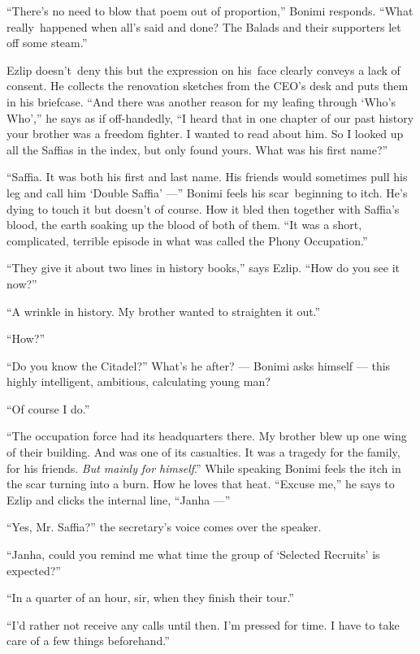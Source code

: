 \documentclass[twoside,11pt]{book}
\begin{document}
``There's no need to blow that poem out of proportion,'' Bonimi responds. ``What
really~happened when all's said and done? The Balads and their supporters let off some steam.''

Ezlip doesn't~deny this but the expression on his~face clearly conveys a lack of consent. He collects the renovation
sketches from the CEO's desk and puts them in his briefcase. ``And there was another reason for my leafing
through `Who's Who','' he says as if off-handedly, ``I heard that in one chapter of our
past history your brother was a freedom fighter. I wanted to read about him. So I looked up all the Saffias in the
index, but only found yours. What was his first name?''

``Saffia. It was both his first and last name. His friends would sometimes pull his leg and call him
`Double Saffia' ---'' Bonimi feels his scar~beginning to itch. He's dying to touch it but doesn't of course.
How it bled then together with Saffia's blood, the earth soaking up the blood of both of them. ``It was a
short, complicated, terrible episode in what was called the Phony Occupation.''

``They give it about two lines in history books,'' says Ezlip. ``How do you see
it now?''

``A wrinkle in history. My brother wanted to straighten it out.''

``How?''

``Do you know the Citadel?'' What's he after? --- Bonimi asks himself --- this highly intelligent,
ambitious, calculating young man?

``Of course I do.''

``The occupation force had its headquarters there. My brother blew up one wing of their building. And was
one of its casualties. It was a tragedy for the family, for his friends. \textit{But mainly} \textit{for
himself}.''  While speaking Bonimi feels the itch in the scar turning into a burn. How he loves that
heat. ``Excuse me,'' he says to Ezlip and clicks the internal line, ``Janha ---''

``Yes, Mr. Saffia?'' the secretary's voice comes over the speaker.

``Janha, could you remind me what time the group of `Selected Recruits' is
expected?''

``In a quarter of an hour, sir, when they finish their tour.''

``I'd rather not receive any calls until then. I'm pressed for time. I have to take care of a few things
beforehand.''
\end{document}
